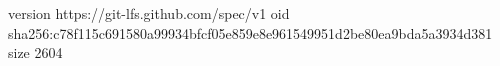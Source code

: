 version https://git-lfs.github.com/spec/v1
oid sha256:c78f115c691580a99934bfcf05e859e8e961549951d2be80ea9bda5a3934d381
size 2604

